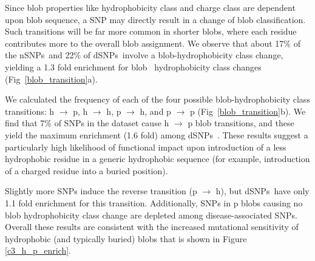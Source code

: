 \documentclass[10pt,letterpaper]{article}
\newcommand{\dSNPs}{dSNPs~}
\newcommand{\nSNPs}{nSNPs~}
\newcommand{\hydrochar}{hydrophobicity class}
\newcommand{\chargechar}{charge class}
\begin{document}
Since blob properties like \hydrochar{} and \chargechar{} are dependent upon blob sequence, a SNP may directly result in a change of blob classification. Such transitions will be far more common in shorter blobs, where each residue contributes more to the overall blob assignment. 
We observe that about 17\% of the \nSNPs and 22\% of \dSNPs involve a blob-\hydrochar{} change, yielding a 1.3 fold enrichment for blob ~\hydrochar{} changes (Fig~\ref{blob_transition}a). 

We calculated the frequency of each of the four possible  blob-\hydrochar{} transitions: h $\rightarrow$ p, h $\rightarrow$ h, p $\rightarrow$ h, and p $\rightarrow$ p (Fig~\ref{blob_transition}b). We find that 7\% of SNPs in the dataset cause h $\rightarrow$ p blob transitions, and these yield the maximum enrichment (1.6 fold) among \dSNPs. These results suggest a particularly high likelihood of functional impact upon introduction of a less hydrophobic residue in a generic hydrophobic sequence (for example, introduction of a charged residue into a buried position).

Slightly more SNPs induce the reverse transition (p $\rightarrow$ h), but \dSNPs have only 1.1 fold enrichment for this transition.  Additionally, SNPs in p blobs causing no blob \hydrochar{} change are depleted among disease-associated SNPs. Overall these results are consistent with the increased mutational sensitivity of hydrophobic (and typically buried) blobs that is shown  in Figure \ref{c3_h_p_enrich}.  

%

\end{document}
